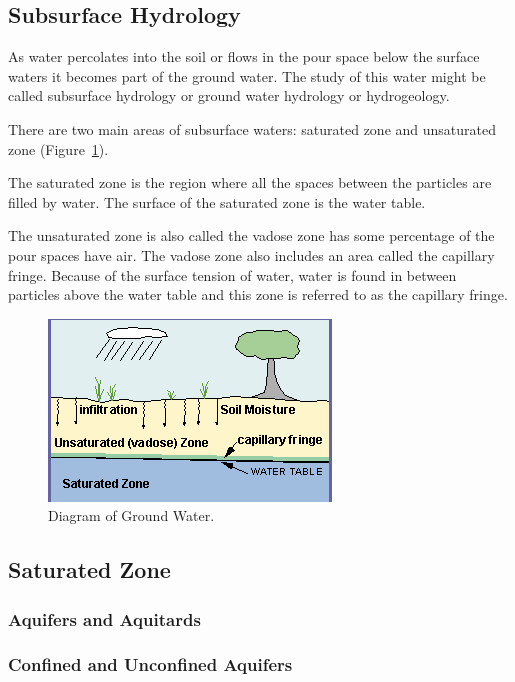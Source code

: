 \documentclass{book}\usepackage{knitr}
\begin{document}
\subsection{Subsurface Hydrology}

As water percolates into the soil or flows in the pour space below the surface waters it becomes part of the ground water. The study of this water might be called subsurface hydrology or ground water hydrology or hydrogeology. 

There are two main areas of subsurface waters: saturated zone and unsaturated zone (Figure~\ref{fig:groundwater}).

The saturated zone is the region where all the spaces between the particles are filled by water. The surface of the saturated zone is the water table. 

The unsaturated zone is also called the vadose zone has some percentage of the pour spaces have air. The vadose zone also includes an area called the capillary fringe. Because of the surface tension of water, water is found in between particles above the water table and this zone is referred to as the capillary fringe. 

\begin{figure}
\includegraphics{images/critical-zone/groundwater}
\caption{Diagram of Ground Water. }
\label{fig:groundwater}
\end{figure}

\subsection{Saturated Zone}

\subsubsection{Aquifers and Aquitards}

\subsubsection{Confined and Unconfined Aquifers}
\end{document}
